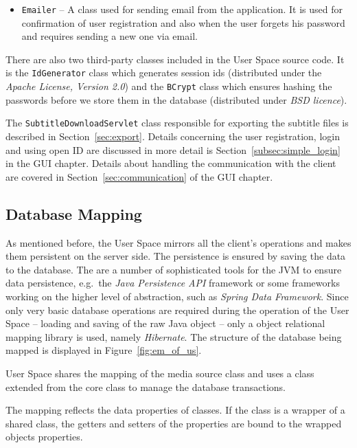 \begin{itemize}
\item {\tt Emailer} -- A class used for sending email from the application. It is used for confirmation of user registration and also when the user forgets his password and requires sending a new one via email.

\end{itemize}

There are also two third-party classes included in the User Space source code. It is the {\tt IdGenerator} class which generates session ids (distributed under the {\it Apache License, Version 2.0}) and the {\tt BCrypt} class which ensures hashing the passwords before we store them in the database (distributed under {\it BSD licence}).

The {\tt SubtitleDownloadServlet} class responsible for exporting the subtitle files is described in Section~\ref{sec:export}. Details concerning the user registration, login and using open ID are discussed in more detail is Section~\ref{subsec:simple_login} in the GUI chapter. Details about handling the communication with the client are covered in Section~\ref{sec:communication} of the GUI chapter.

\subsection{Database Mapping}
\label{subsec:database_mapping}

As mentioned before, the User Space mirrors all the client's operations and makes them persistent on the server side. The persistence is ensured by saving the data to the database. The are a number of sophisticated tools for the JVM to ensure data persistence, e.g.\ the \emph{Java Persistence API} framework or some frameworks working on the higher level of abstraction, such as \emph{Spring Data Framework}. Since only very basic database operations are required during the operation of the User Space -- loading and saving of the raw Java object -- only a object relational mapping library is used, namely \emph{Hibernate}. The structure of the database being mapped is displayed in Figure~\ref{fig:em_of_us}.

User Space shares the mapping of the media source class and uses a class extended from the core class to manage the database transactions.

The mapping reflects the data properties of classes. If the class is a wrapper of a shared class, the getters and setters of the properties are bound to the wrapped objects properties.

